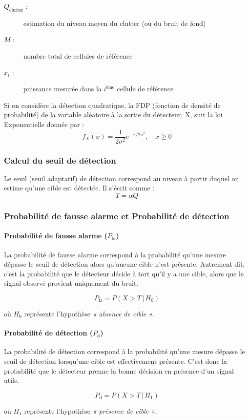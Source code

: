 \begin{description}
  \item[${Q}_{\text{clutter}}$ :] estimation du niveau moyen du clutter (ou du bruit de fond)
  \item[$M$ :] nombre total de cellules de référence
  \item[$x_i$ :] puissance mesurée dans la $i^{\text{ème}}$ cellule de référence
\end{description}

Si on considère la détection quadratique, la FDP (fonction de densité de probabilité) de la variable aléatoire à la sortie du détecteur, X, suit
la loi Exponentielle donnée par :
\begin{equation}
f_X(x) = \frac{1}{2\sigma^2} e^{-x / 2\sigma^2}, \quad x \ge 0
\end{equation}






\subsubsection{Calcul du seuil de détection}

Le seuil (seuil adaptatif) de détection correspond au niveau à partir duquel on estime qu'une cible est détectée. Il s'écrit comme : 
\begin{equation}
T = \alpha Q
\end{equation}

\subsubsection{Probabilité de fausse alarme et Probabilité de détection}


\paragraph{Probabilité de fausse alarme (\(P_{\text{fa}}\))}  
La probabilité de fausse alarme correspond à la probabilité qu'une mesure dépasse le seuil de détection alors qu'aucune cible n'est présente.  
Autrement dit, c'est la probabilité que le détecteur décide à tort qu'il y a une cible, alors que le signal observé provient uniquement du bruit.

\[
P_{\text{fa}} = P(X > T \,|\, H_0)
\]

où \( H_0 \) représente l'hypothèse \textit{« absence de cible »}.

\vspace{1em}

\paragraph{Probabilité de détection (\(P_{\text{d}}\))}  
La probabilité de détection correspond à la probabilité qu'une mesure dépasse le seuil de détection lorsqu'une cible est effectivement présente.  
C'est donc la probabilité que le détecteur prenne la bonne décision en présence d'un signal utile.

\[
P_{\text{d}} = P(X > T \,|\, H_1)
\]

où \( H_1 \) représente l'hypothèse \textit{« présence de cible »}.
